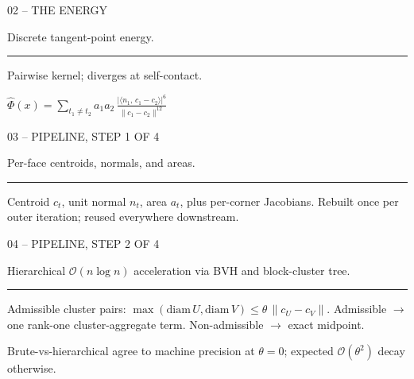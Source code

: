 \documentclass[aspectratio=169,14pt]{beamer}
\newcommand{\decklabel}[1]{%
  {\fontsize{8.5}{11}\selectfont\color{Label}\MakeUppercase{#1}\par}%
}
\newcommand{\slidetitle}[1]{%
  {\fontsize{25}{30}\selectfont\color{Text}\raggedright #1\par}%
}
\newcommand{\slidebody}[1]{%
  {\fontsize{12.2}{15.4}\selectfont\color{Dim}\raggedright #1\par}%
}
\newcommand{\tinynote}[1]{%
  {\fontsize{8.5}{10}\selectfont\color{Label}#1\par}%
}
\newcommand{\thinrule}{%
  \par\vspace{0.24cm}%
  {\color{Rule}\rule{2.45cm}{0.35pt}}%
  \par\vspace{0.25cm}%
}
\begin{document}
\begin{frame}[plain]
  \vspace*{0.82cm}
  \hspace*{1.22cm}
  \begin{minipage}{0.78\paperwidth}
  \raggedright
  \decklabel{02 -- The energy}
  \vspace{0.54cm}
  \slidetitle{Discrete tangent-point energy.}
  \thinrule
  \slidebody{Pairwise kernel; diverges at self-contact.}
  \vspace{0.55cm}
  \begin{center}
  {\fontsize{14}{16}\selectfont\color{Text}
  $\displaystyle
    \widehat{\Phi}(x)
      = \sum_{t_1 \ne t_2}
        a_1 a_2 \,
        \frac{\bigl|\langle n_1,\, c_1 - c_2\rangle\bigr|^{6}}
             {\|c_1 - c_2\|^{12}}
  $%
  }
  \end{center}
  \end{minipage}
\end{frame}

\begin{frame}[plain]
  \vspace*{0.82cm}
  \hspace*{1.22cm}
  \begin{minipage}{0.78\paperwidth}
  \raggedright
  \decklabel{03 -- Pipeline, step 1 of 4}
  \vspace{0.54cm}
  \slidetitle{Per-face centroids, normals, and areas.}
  \thinrule
  \slidebody{Centroid $c_t$, unit normal $n_t$, area $a_t$, plus per-corner Jacobians. Rebuilt once per outer iteration; reused everywhere downstream.}
  \end{minipage}
\end{frame}

\begin{frame}[plain]
  \vspace*{0.82cm}
  \hspace*{1.22cm}
  \begin{minipage}{0.78\paperwidth}
  \raggedright
  \decklabel{04 -- Pipeline, step 2 of 4}
  \vspace{0.54cm}
  \slidetitle{Hierarchical $\mathcal{O}(n \log n)$ acceleration via BVH and block-cluster tree.}
  \thinrule
  \slidebody{Admissible cluster pairs: $\max(\mathrm{diam}\,U, \mathrm{diam}\,V) \le \theta\,\|c_U - c_V\|$. Admissible $\to$ one rank-one cluster-aggregate term. Non-admissible $\to$ exact midpoint.}
  \vspace{0.20cm}
  \tinynote{Brute-vs-hierarchical agree to machine precision at $\theta = 0$; expected $\mathcal{O}(\theta^2)$ decay otherwise.}
  \end{minipage}
\end{frame}
\end{document}
